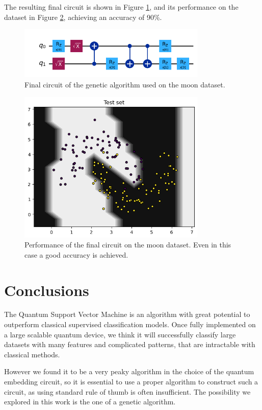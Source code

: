 \documentclass[12pt]{article}
\begin{document}
The resulting final circuit is shown in Figure \ref{fig:mooncircuit}, and its performance on the dataset in Figure \ref{fig:moonboh}, achieving an accuracy of 90\%. 
\begin{figure}[h!]
    \centering
    \includegraphics[width=0.8\textwidth]{images/mooncircuit.png}
    \caption{Final circuit of the genetic algorithm used on the moon dataset.}
    \label{fig:mooncircuit}
\end{figure}\begin{figure}[h!]
    \centering
    \includegraphics[width=0.8\textwidth]{images/moonboh.png}
    \caption{Performance of the final circuit on the moon dataset. Even in this case a good accuracy is achieved.}
    \label{fig:moonboh}
\end{figure}


\newpage 
\section{Conclusions}
The Quantum Support Vector Machine is an algorithm with great potential to outperform classical supervised classification models. Once fully implemented on a large scalable quantum device, we think it will successfully classify large datasets with many features and complicated patterns, that are intractable with classical methods. 

However we found it to be a very peaky algorithm in the choice of the quantum embedding circuit, so it is essential to use a proper algorithm to construct such a circuit, as using standard rule of thumb is often insufficient. The possibility we explored in this work is the one of a genetic algorithm. 
\end{document}
